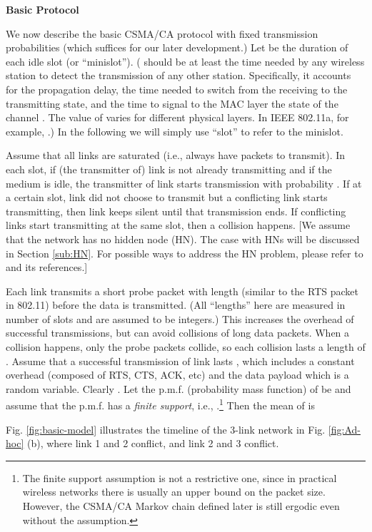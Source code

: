 \documentclass{IEEEtran}
\begin{document}
{\bf Basic Protocol}\medskip{}


We now describe the basic CSMA/CA protocol with fixed transmission
probabilities (which suffices for our later development.) Let 
be the duration of each idle slot (or {}``minislot''). (
should be at least the time needed by any wireless station to detect
the transmission of any other station. Specifically, it accounts for
the propagation delay, the time needed to switch from the receiving
to the transmitting state, and the time to signal to the MAC layer
the state of the channel \cite{Bianchi}. The value of 
varies for different physical layers. In IEEE 802.11a, for example,
.) In the following we will simply use {}``slot''
to refer to the minislot. 

Assume that all links are saturated (i.e., always have packets to
transmit). In each slot, if (the transmitter of) link  is not
already transmitting and if the medium is idle, the transmitter of
link  starts transmission with probability . If at a certain
slot, link  did not choose to transmit but a conflicting link
starts transmitting, then link  keeps silent until that transmission
ends. If conflicting links start transmitting at the same slot, then
a collision happens. {[}We assume that the network has no hidden node
(HN). The case with HNs will be discussed in Section \ref{sub:HN}.
For possible ways to address the HN problem, please refer to \cite{Jiang-Liew}
and its references.] 

Each link transmits a short probe packet with length  (similar
to the RTS packet in 802.11) before the data is transmitted. (All
{}``lengths'' here are measured in number of slots and are assumed
to be integers.) This increases the overhead of successful transmissions,
but can avoid collisions of long data packets. When a collision happens,
only the probe packets collide, so each collision lasts a length of
. Assume that a successful transmission of link  lasts
, which includes a constant overhead  (composed
of RTS, CTS, ACK, etc) and the data payload  which
is a random variable. Clearly . Let the p.m.f.
(probability mass function) of  be 
and assume that the p.m.f. has a \emph{finite support}, i.e., .\textcolor{blue}{}\footnote{The finite support assumption is not a restrictive one, since in practical
wireless networks there is usually an upper bound on the packet size.
However, the CSMA/CA Markov chain defined later is still ergodic even
without the assumption.}\textcolor{blue}{ }Then the mean of  is 


Fig. \ref{fig:basic-model} illustrates the timeline of the 3-link
network in Fig. \ref{fig:Ad-hoc} (b), where link 1 and 2 conflict,
and link 2 and 3 conflict.
\end{document}
